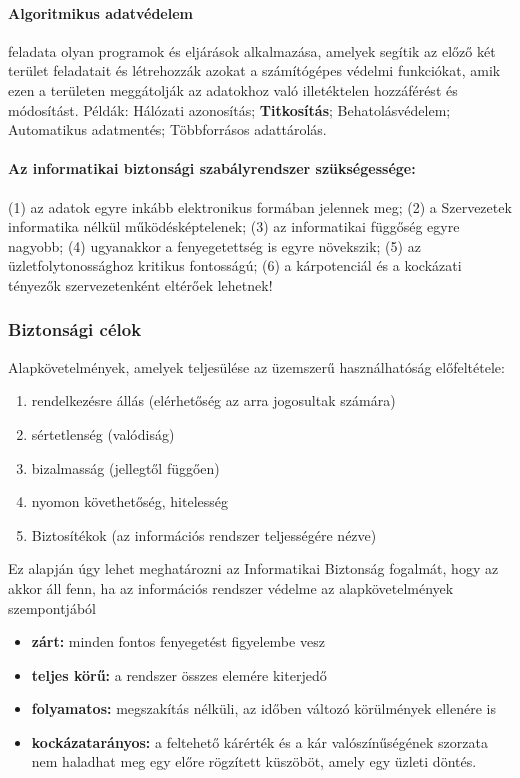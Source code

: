 \paragraph{Algoritmikus adatvédelem} feladata olyan programok és eljárások alkalmazása, amelyek segítik az előző két terület feladatait és létrehozzák azokat a számítógépes védelmi funkciókat, amik ezen a területen meggátolják az adatokhoz való illetéktelen hozzáférést és módosítást. Példák: Hálózati azonosítás; \textbf{Titkosítás}; Behatolásvédelem; Automatikus adatmentés; Többforrásos adattárolás.

\paragraph{Az informatikai biztonsági szabályrendszer szükségessége:} (1) az adatok egyre inkább elektronikus formában jelennek meg; (2) a Szervezetek informatika nélkül működésképtelenek; (3) az informatikai függőség egyre nagyobb; (4) ugyanakkor a fenyegetettség is egyre növekszik; (5) az üzletfolytonossághoz kritikus fontosságú; (6) a kárpotenciál és a kockázati tényezők szervezetenként eltérőek lehetnek!

\subsubsection{Biztonsági célok}
Alapkövetelmények, amelyek teljesülése az üzemszerű használhatóság előfeltétele:
\begin{enumerate}
	\item rendelkezésre állás (elérhetőség az arra jogosultak számára)
	\item sértetlenség (valódiság)
	\item bizalmasság (jellegtől függően)
	\item nyomon követhetőség, hitelesség
	\item Biztosítékok (az információs rendszer teljességére nézve)
\end{enumerate}
Ez alapján úgy lehet meghatározni az Informatikai Biztonság fogalmát, hogy az akkor áll fenn, ha az információs rendszer védelme az alapkövetelmények szempontjából
\begin{itemize}
	\item \textbf{zárt:} minden fontos fenyegetést figyelembe vesz
	\item \textbf{teljes körű:} a rendszer összes elemére kiterjedő
	\item \textbf{folyamatos:} megszakítás nélküli, az időben változó körülmények ellenére is
	\item \textbf{kockázatarányos:} a feltehető kárérték és a kár valószínűségének szorzata nem haladhat meg egy előre rögzített küszöböt, amely egy üzleti döntés.
\end{itemize}

